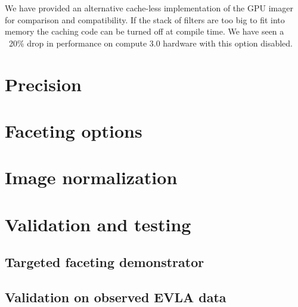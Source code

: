 We have provided an alternative cache-less implementation of the GPU imager for comparison and compatibility.
If the stack of filters are too big to fit into memory the caching code can be turned off at compile time. We have seen
a ~20\% drop in performance on compute 3.0 hardware with this option disabled.
\section{Precision}
\section{Faceting options}
\section{Image normalization}
\section{Validation and testing}
\subsection{Targeted faceting demonstrator}
\subsection{Validation on observed EVLA data}